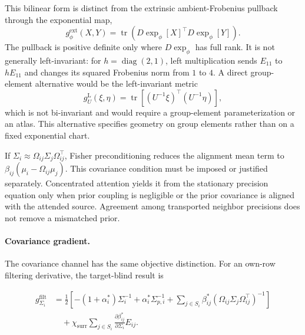 \documentclass[twoside,11pt]{article}
\begin{document}
This bilinear form is distinct from the extrinsic ambient-Frobenius pullback through the exponential map,
\begin{equation}
g_{\phi}^{\mathrm{ext}}(X,Y)
=\operatorname{tr}\left(D\exp_{\phi}[X]^\top D\exp_{\phi}[Y]\right).
\label{eq:extrinsic_exp_pullback}
\end{equation}
The pullback is positive definite only where $D\exp_{\phi}$ has full rank. It is not generally left-invariant: for $h=\operatorname{diag}(2,1)$, left multiplication sends $E_{11}$ to $hE_{11}$ and changes its squared Frobenius norm from $1$ to $4$. A direct group-element alternative would be the left-invariant metric
\begin{equation}
g_U^{\mathrm{L}}(\xi,\eta)
=\operatorname{tr}\left[(U^{-1}\xi)^\top(U^{-1}\eta)\right],
\label{eq:left_invariant_group_metric}
\end{equation}
which is not bi-invariant and would require a group-element parameterization or an atlas. This alternative specifies geometry on group elements rather than on a fixed exponential chart.

If $\Sigma_i\approx\Omega_{ij}\Sigma_j\Omega_{ij}^\top$, Fisher preconditioning reduces the alignment mean term to $\beta_{ij}(\mu_i-\Omega_{ij}\mu_j)$. This covariance condition must be imposed or justified separately. Concentrated attention yields it from the stationary precision equation only when prior coupling is negligible or the prior covariance is aligned with the attended source. Agreement among transported neighbor precisions does not remove a mismatched prior.

\paragraph{Covariance gradient.}

The covariance channel has the same objective distinction. For an own-row filtering derivative, the target-blind result is

\begin{equation}
\boxed{
\begin{aligned}
g_{\Sigma_i}^{\mathrm{filt}}
&= \frac{1}{2}
\left[
-(1+\alpha_i^*) \Sigma_i^{-1}
+ \alpha_i^* \Sigma_{p,i}^{-1}
+ \sum_{j\in S_i} \beta_{ij}^*
(\Omega_{ij}\Sigma_j\Omega_{ij}^\top)^{-1}
\right] \\
&\quad+\chi_{\mathrm{surr}}
\sum_{j\in S_i}
\frac{\partial\beta_{ij}^*}{\partial\Sigma_i}E_{ij}.
\end{aligned}
}
\label{eq:Sigma_gradient_main}
\end{equation}
\end{document}
